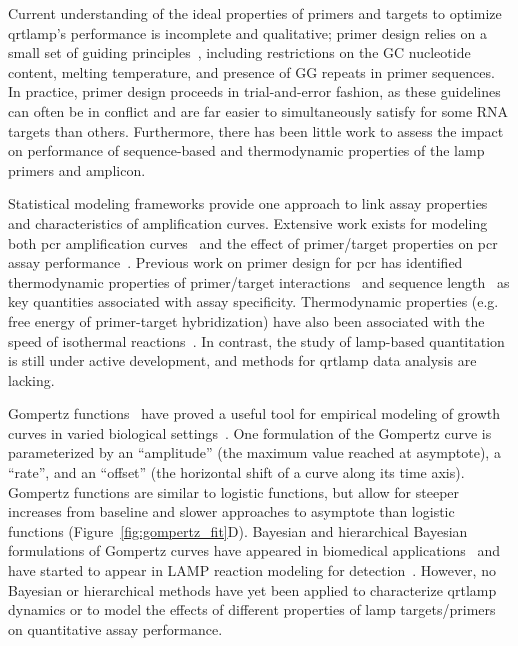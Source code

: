 \documentclass[../thesis.tex]{subfiles}
\begin{document}
Current understanding of the ideal properties of primers and targets to optimize \gls{qrtlamp}'s performance is incomplete and qualitative; primer design relies on a small set of guiding principles~\citep{panno_loop_2020}, including restrictions on the GC nucleotide content, melting temperature, and presence of GG repeats in primer sequences. In practice, primer design proceeds in trial-and-error fashion, as these guidelines can often be in conflict and are far easier to simultaneously satisfy for some RNA targets than others. Furthermore, there has been little work to assess the impact on performance of sequence-based and thermodynamic properties of the \gls{lamp} primers and amplicon.

Statistical modeling frameworks provide one approach to link assay properties and characteristics of amplification curves. Extensive work exists for modeling both \gls{pcr} amplification curves~\citep{spiess_highly_2008, matz_no_2013, subramanian_empirical_2014,  nguyen_quantification_2020} and the effect of primer/target properties on \gls{pcr} assay performance~\citep{mallona_pcrefficiency_2011, wright_exploiting_2014, doring_modeling_2019}. Previous work on primer design for \gls{pcr} has identified thermodynamic properties of primer/target interactions~\citep{mann_thermodynamic_2009, li_primer_2010, doring_modeling_2019} and sequence length~\citep{huang_developing_2022} as key quantities associated with assay specificity. Thermodynamic properties (e.g. free energy of primer-target hybridization) have also been associated with the speed of isothermal reactions~\citep{kimura_optimization_2011}.
In contrast, the study of \gls{lamp}-based quantitation is still under active development, and methods for \gls{qrtlamp} data analysis are lacking. 

Gompertz functions~\citep{gompertz_xxiv_1825} have proved a useful tool for empirical modeling of growth curves in varied biological settings~\citep{tjorve_use_2017}.  One formulation of the Gompertz curve is parameterized by an ``amplitude'' (the maximum value reached at asymptote), a ``rate'', and an ``offset'' (the horizontal shift of a curve along its time axis). Gompertz functions are similar to logistic functions, but allow for steeper increases from baseline and slower approaches to asymptote than logistic functions (Figure~\ref{fig:gompertz_fit}D). Bayesian and hierarchical Bayesian formulations of Gompertz curves have appeared in biomedical applications~\citep{wiper_bayesian_2010, sasaki_informative_2016, tutkun_bayesian_2016, gotuzzo_bayesian_2019, vaghi_population_2020, berihuete_bayesian_2021} and have started to appear in LAMP reaction modeling for detection~\citep{carvalho_faster_2021}. However, no Bayesian or hierarchical methods have yet been applied to characterize \gls{qrtlamp} dynamics or to model the effects of different properties of \gls{lamp} targets/primers on quantitative assay performance.
\end{document}
